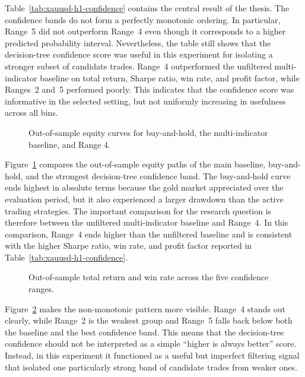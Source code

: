 Table~\ref{tab:xauusd-h1-confidence} contains the central result of the thesis.
The confidence bands do not form a perfectly monotonic ordering. In
particular, Range~5 did not outperform Range~4 even though it corresponds to a
higher predicted probability interval. Nevertheless, the table still shows that
the decision-tree confidence score was useful in this experiment for isolating a
stronger subset of candidate trades. Range~4 outperformed the unfiltered
multi-indicator baseline on total return, Sharpe ratio, win rate, and profit
factor, while Ranges~2 and~5 performed poorly. This indicates that the
confidence score was informative in the selected setting, but not uniformly
increasing in usefulness across all bins.

\begin{figure}[htbp]
\centering

\caption[Out-of-sample equity curves]{Out-of-sample equity curves for buy-and-hold, the multi-indicator baseline, and Range 4.}
\label{fig:xauusd-h1-equity}
\end{figure}

Figure~\ref{fig:xauusd-h1-equity} compares the out-of-sample equity paths of
the main baseline, buy-and-hold, and the strongest decision-tree confidence
band. The buy-and-hold curve ends highest in absolute terms because the gold
market appreciated over the evaluation period, but it also experienced a larger
drawdown than the active trading strategies. The important comparison for the
research question is therefore between the unfiltered multi-indicator baseline
and Range~4. In this comparison, Range~4 ends higher than the unfiltered
baseline and is consistent with the higher Sharpe ratio, win rate, and profit
factor reported in Table~\ref{tab:xauusd-h1-confidence}.

\begin{figure}[htbp]
\centering

\caption[Confidence-range return and win rate]{Out-of-sample total return and win rate across the five confidence ranges.}
\label{fig:xauusd-h1-confidence-plot}
\end{figure}

Figure~\ref{fig:xauusd-h1-confidence-plot} makes the non-monotonic pattern more
visible. Range~4 stands out clearly, while Range~2 is the weakest group and
Range~5 falls back below both the baseline and the best confidence band. This
means that the decision-tree confidence should not be interpreted as a simple
``higher is always better'' score. Instead, in this experiment it functioned as
a useful but imperfect filtering signal that isolated one particularly strong
band of candidate trades from weaker ones.

